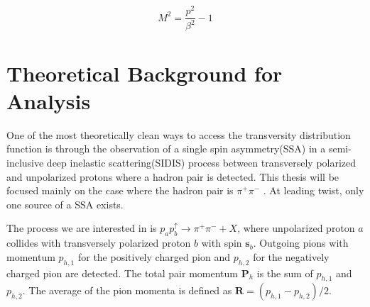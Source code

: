 \documentclass[abstract = on,listof=totoc, bibliography=totoc]{scrreprt}
\newcommand{\pip}{\pi^+}
\newcommand{\pim}{\pi^-}
\newcommand{\pair}{$\pip\pim$ }
\begin{document}
\begin{equation}
\label{eq:mtof}
M^2 = \frac{p^2}{\beta^2} - 1
\end{equation}



\chapter{Theoretical Background for Analysis}
\label{ch:theory}

One of the most theoretically clean ways to access the transversity distribution function is through the observation of a single spin asymmetry(SSA) in a semi-inclusive deep inelastic scattering(SIDIS) process between transversely polarized and unpolarized protons where a hadron pair is detected\cite{bacchettaRadici2}. This thesis will be focused mainly on the case where the hadron pair is \pair. At leading twist, only one source of a SSA exists\cite{bacchettaRadici2}. 

The process we are interested in is $p_ap_b^\uparrow \rightarrow \pi^+\pi^- + X$, where unpolarized proton $a$ collides with transversely polarized proton $b$ with spin $\boldsymbol{s}_b$. Outgoing pions with momentum $p_{h,1}$ for the positively charged pion and $p_{h,2}$ for the negatively charged pion are detected. The total pair momentum $\bm{P}_h$ is the sum of $p_{h,1}$ and $p_{h,2}$. The average of the pion momenta is defined as $\bm{R}= (p_{h,1}-p_{h,2})/2$.
\end{document}
